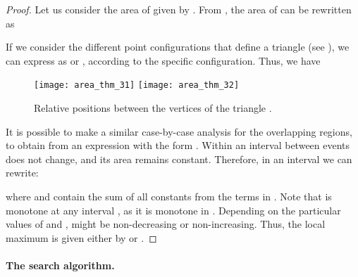 \documentclass[11pt,letterpaper,english]{article}
\theoremstyle{definition}
\begin{document}
\begin{proof}
  Let us consider the area of  given by
  . From
  , the area
  of  can be rewritten as

  
  If we consider the different point configurations that define a
  triangle (see ), we can express
   as  or
  , according to the specific
  configuration. Thus, we have
    

  \begin{figure}[ht]
    \centering
    \subcaptionbox{\label{apps:area:fig:events:1}}
    {\texttt{[image: area\_thm\_31]}}
    \hspace{1.5cm}
    \subcaptionbox{\label{apps:area:fig:events:2}}
    {\texttt{[image: area\_thm\_32]}}
    \caption{Relative positions between the vertices of the triangle
      .}
    \label{apps:area:fig:events}
  \end{figure}

  It is possible to make a similar case-by-case analysis for the
  overlapping regions, to obtain from  an
  expression with the form . Within an interval
  between events  does not change, and its area remains
  constant. Therefore, in an interval  we can rewrite:

  
  where  and  contain the sum of all constants from the terms in
  . Note that 
  is monotone at any interval , as it is
  monotone in . Depending on the particular values of  and
  ,  might be non-decreasing or
  non-increasing. Thus, the local maximum is given either by 
  or .
\end{proof}

\paragraph{The search algorithm.}
\end{document}
